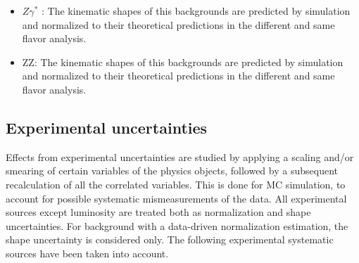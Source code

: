 \begin{itemize}
\item $ Z \gamma^*$  : The kinematic shapes of this backgrounds are predicted by simulation and
normalized to their theoretical predictions in the different and same flavor analysis.

\item ZZ: The kinematic shapes of this backgrounds are predicted by simulation and normalized to their theoretical predictions in the different and same flavor analysis.

\end{itemize}




\subsection*{Experimental uncertainties}
Effects from experimental uncertainties are studied by applying a scaling and/or smearing of
certain variables of the physics objects, followed by a subsequent recalculation of all the correlated variables. This is done for MC simulation, to account for possible systematic mismeasurements of the data. All experimental sources except luminosity are treated both as normalization and shape uncertainties. For background with a data-driven normalization estimation,
the shape uncertainty is considered only. The following experimental systematic sources have
been taken into account.

